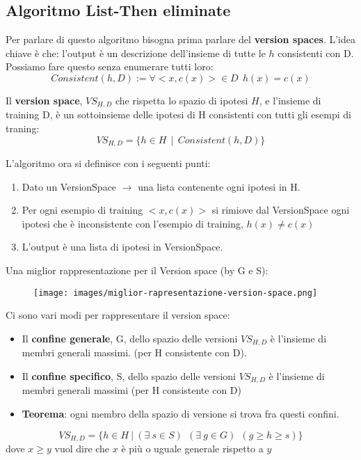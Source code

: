 \subsection{Algoritmo List-Then eliminate}
Per parlare di questo algoritmo bisogna prima parlare del \textbf{version spaces}. L'idea chiave è che: l'output
è un descrizione dell'insieme di tutte le $h$ consistenti con D. Possiamo fare questo senza enumerare tutti loro:
$$Consistent(h, D) := \forall <x, c(x)> \in D\:\: h(x) = c(x)$$
\begin{definition}
    Il \textbf{version space}, $VS_{H,D}$ che rispetta lo spazio di ipotesi $H$, e l'insieme di training D, 
    è un sottoinsieme delle ipotesi di H consistenti con tutti gli esempi di traning:
    $$VS_{H,D} = \{h \in H \:\:|\:\: Consistent(h, D)\}$$
\end{definition}
\hspace{-15pt}L'algoritmo ora si definisce con i seguenti punti:
\begin{enumerate}
    \item Dato un VersionSpace $\to$ una lista contenente ogni ipotesi in H.
    \item Per ogni esempio di training $<x, c(x)>$ si rimiove dal VersionSpace ogni ipotesi
    che è inconsistente con l'esempio di training, $h(x) \neq c(x)$
    \item L'output è una lista di ipotesi in VersionSpace.
\end{enumerate}
Una miglior rappresentazione per il Version space (by G e S):
\begin{figure}[h!]
    \centering
    \texttt{[image: images/miglior-rapresentazione-version-space.png]}
\end{figure}
\begin{definition}
    Ci sono vari modi per rappresentare il version space:
    \begin{itemize}
        \item Il \textbf{confine generale}, G, dello spazio delle versioni $VS_{H,D}$ è l'insieme di 
        membri generali massimi. (per H consistente con D).
        \item Il \textbf{confine specifico}, S, dello spazio delle versioni $VS_{H,D}$ è l'insieme di
        membri generali massimi (per H consistente con D)
        \item \textbf{Teorema}: ogni membro della spazio di versione si trova fra questi confini.
    \end{itemize}
\end{definition}
$$VS_{H,D} = \{h \in H \:|\: (\exists \: s \in S) \:\: (\exists \: g \in G) \:\:(g \geq h \geq s)\}$$
dove $x \geq y$ vuol dire che $x$ è più o uguale generale rispetto a $y$

